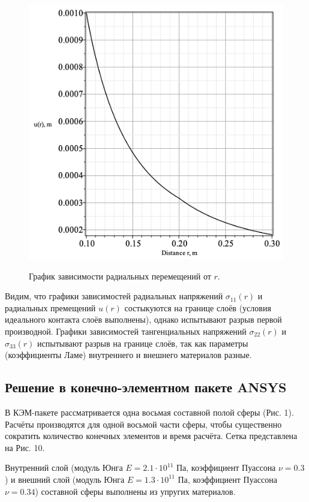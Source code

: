 \documentclass[a4paper,12pt]{article}	%
\begin{document}
\begin{figure}[H]
  \centering
  \includegraphics[scale=0.68]{img/Graph4_Lab1.png}\\
  \caption{График зависимости радиальных перемещений от $r$.}
  \label{fig_9}
\end{figure}
Видим, что графики зависимостей радиальных напряжений $\sigma_{11}(r)$ и радиальных премещений $u(r)$ состыкуются на границе слоёв (условия идеального контакта слоёв выполнены), однако испытывают разрыв первой производной. Графики зависимостей тангенциальных напряжений $\sigma_{22}(r)$ и $\sigma_{33}(r)$ испытывают разрыв на границе слоёв, так как параметры (коэффициенты Ламе) внутреннего и внешнего материалов разные.
\newpage

\subsection{Решение в конечно-элементном пакете ANSYS}

В КЭМ-пакете рассматривается одна восьмая составной полой сферы (Рис. 1). Расчёты производятся для одной восьмой части сферы, чтобы существенно сократить количество конечных элементов и время расчёта. Сетка представлена на Рис. 10.

Внутренний слой (модуль Юнга $E=2.1\cdot10^{11}$ Па, коэффициент Пуассона $\nu=0.3$) и внешний слой (модуль Юнга $E=1.3\cdot10^{11}$ Па, коэффициент Пуассона $\nu=0.34$) составной сферы выполнены из упругих материалов.
\end{document}
